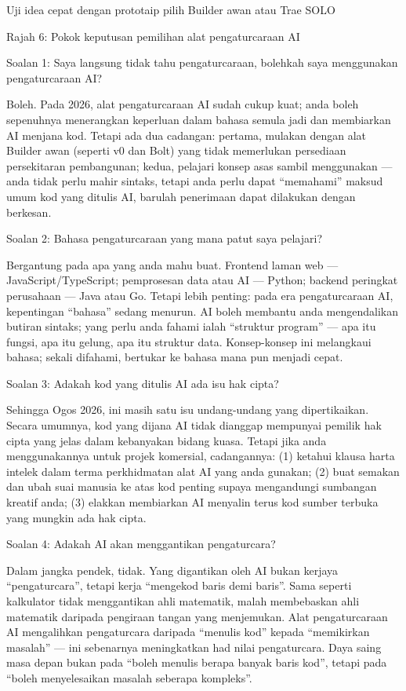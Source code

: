 Uji idea cepat dengan prototaip pilih Builder awan atau Trae SOLO

\begin{center}\small\color{gray}Rajah 6: Pokok keputusan pemilihan alat pengaturcaraan AI\end{center}


Soalan 1: Saya langsung tidak tahu pengaturcaraan, bolehkah saya menggunakan pengaturcaraan AI?

Boleh. Pada 2026, alat pengaturcaraan AI sudah cukup kuat; anda boleh sepenuhnya menerangkan keperluan dalam bahasa semula jadi dan membiarkan AI menjana kod. Tetapi ada dua cadangan: pertama, mulakan dengan alat Builder awan (seperti v0 dan Bolt) yang tidak memerlukan persediaan persekitaran pembangunan; kedua, pelajari konsep asas sambil menggunakan — anda tidak perlu mahir sintaks, tetapi anda perlu dapat “memahami” maksud umum kod yang ditulis AI, barulah penerimaan dapat dilakukan dengan berkesan.

Soalan 2: Bahasa pengaturcaraan yang mana patut saya pelajari?

Bergantung pada apa yang anda mahu buat. Frontend laman web — JavaScript/TypeScript; pemprosesan data atau AI — Python; backend peringkat perusahaan — Java atau Go. Tetapi lebih penting: pada era pengaturcaraan AI, kepentingan “bahasa” sedang menurun. AI boleh membantu anda mengendalikan butiran sintaks; yang perlu anda fahami ialah “struktur program” — apa itu fungsi, apa itu gelung, apa itu struktur data. Konsep-konsep ini melangkaui bahasa; sekali difahami, bertukar ke bahasa mana pun menjadi cepat.

Soalan 3: Adakah kod yang ditulis AI ada isu hak cipta?

Sehingga Ogos 2026, ini masih satu isu undang-undang yang dipertikaikan. Secara umumnya, kod yang dijana AI tidak dianggap mempunyai pemilik hak cipta yang jelas dalam kebanyakan bidang kuasa. Tetapi jika anda menggunakannya untuk projek komersial, cadangannya: (1) ketahui klausa harta intelek dalam terma perkhidmatan alat AI yang anda gunakan; (2) buat semakan dan ubah suai manusia ke atas kod penting supaya mengandungi sumbangan kreatif anda; (3) elakkan membiarkan AI menyalin terus kod sumber terbuka yang mungkin ada hak cipta.

Soalan 4: Adakah AI akan menggantikan pengaturcara?

Dalam jangka pendek, tidak. Yang digantikan oleh AI bukan kerjaya “pengaturcara”, tetapi kerja “mengekod baris demi baris”. Sama seperti kalkulator tidak menggantikan ahli matematik, malah membebaskan ahli matematik daripada pengiraan tangan yang menjemukan. Alat pengaturcaraan AI mengalihkan pengaturcara daripada “menulis kod” kepada “memikirkan masalah” — ini sebenarnya meningkatkan had nilai pengaturcara. Daya saing masa depan bukan pada “boleh menulis berapa banyak baris kod”, tetapi pada “boleh menyelesaikan masalah seberapa kompleks”.

